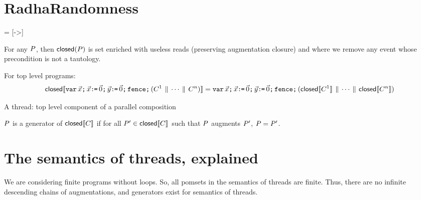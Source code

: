 \section{RadhaRandomness}

\newcommand{\acylic}{\mathit{acyclic}}

 = [->]
\newcommand{\feco}{\mathit{eco}}
\newcommand{\reco}{\ensuremath{\mathrel{\mathsf{eco}}}}%
\newcommand{\xeco}{\xarrowtikz{eco}{eco}}

\newcommand{\reads}{\mathit{Reads}}
\newcommand{\Seq}{{\tt Sequential}}

\newcommand{\writes}{\mathit{Writes}}
\newcommand{\pomf}[1]{Fun_{#1}}
\newcommand{\pomFn}{\mathit{PomFn}}
\newcommand{\power}{\mathcal{P}}
\newcommand{\aFn}{F}
\newcommand{\aRSet}{R}
\newcommand{\bRSet}{S}
\newcommand{\aWSet}{U}
\newcommand{\bWSet}{V}
\newcommand{\aWrite}{\aAct_w}
\newcommand{\bPS}{\aPS'}
\newcommand{\cPS}{\aPS_1}
\newcommand{\dPS}{\aPS'_1}
\newcommand{\after}{\mathit{after}}
\newcommand{\size}{\mathit{size}}


For any $P$, then $\textsf{closed}(P)$ is set enriched with useless reads
(preserving augmentation closure) and where we remove any event whose
precondition is not a tautology.

For top level programs:
\begin{displaymath}
  \textsf{closed}\llbracket\texttt{var}\,\vec{x}\texttt{;}\,
    \vec{x}\texttt{:}\mkern-1mu\texttt{=}\,\vec{0}\texttt{;}\,
    \vec{y}\texttt{:}\mkern-1mu\texttt{=}\,\vec{0}\texttt{;}\,
    \texttt{fence}\texttt{;}\,
    (C^1 \,\mathbin{\|}\, \cdots \,\mathbin{\|}\, C^n)\rrbracket
  =
  \texttt{var}\,\vec{x}\texttt{;}\,
    \vec{x}\texttt{:}\mkern-1mu\texttt{=}\,\vec{0}\texttt{;}\,
    \vec{y}\texttt{:}\mkern-1mu\texttt{=}\,\vec{0}\texttt{;}\,
    \texttt{fence}\texttt{;}\,
    (\textsf{closed}\llbracket C^1\rrbracket \,\mathbin{\|}\, \cdots \,\mathbin{\|}\, \textsf{closed}\llbracket C^n\rrbracket)
\end{displaymath}

\begin{definition}
A thread: top level component of a parallel composition
\end{definition}

\begin{definition}
$P$ is a generator of  $\textsf{closed}\llbracket C\rrbracket$ if for all $\bPS \in \semClosed{\aCmd}$ such that $P$ augments $\bPS$, $\aPS = \bPS$.
\end{definition}

\section{The semantics  of threads, explained}
We are considering finite programs without loops.  So,  all pomsets in the semantics of threads are finite.  Thus, there are no infinite descending chains of augmentations, and  generators exist for semantics of threads.

